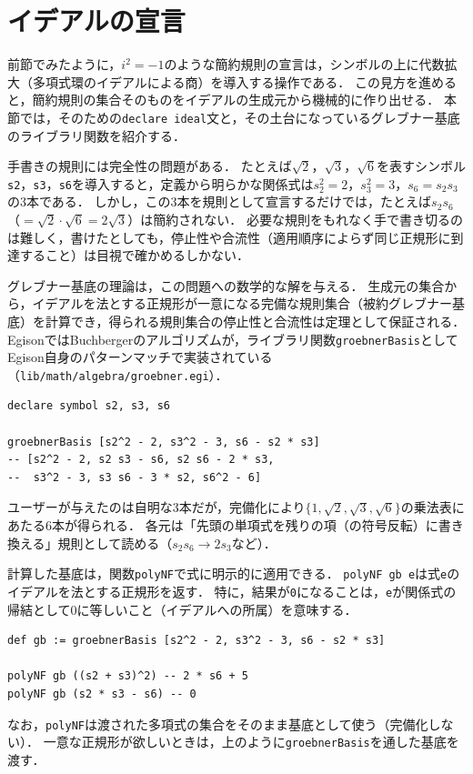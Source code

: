 \section{イデアルの宣言}\label{casdetail-ideal}

前節でみたように，$i^2 = -1$のような簡約規則の宣言は，シンボルの上に代数拡大（多項式環のイデアルによる商）を導入する操作である．
この見方を進めると，簡約規則の集合そのものをイデアルの生成元から機械的に作り出せる．
本節では，そのための\lstinline{declare ideal}文と，その土台になっているグレブナー基底のライブラリ関数を紹介する．

手書きの規則には完全性の問題がある．
たとえば$\sqrt{2}$，$\sqrt{3}$，$\sqrt{6}$を表すシンボル\lstinline{s2}，\lstinline{s3}，\lstinline{s6}を導入すると，定義から明らかな関係式は$s_2^2 = 2$，$s_3^2 = 3$，$s_6 = s_2 s_3$の3本である．
しかし，この3本を規則として宣言するだけでは，たとえば$s_2 s_6$（$= \sqrt{2}\cdot\sqrt{6} = 2\sqrt{3}$）は簡約されない．
必要な規則をもれなく手で書き切るのは難しく，書けたとしても，停止性や合流性（適用順序によらず同じ正規形に到達すること）は目視で確かめるしかない．

グレブナー基底の理論は，この問題への数学的な解を与える．
生成元の集合から，イデアルを法とする正規形が一意になる完備な規則集合（被約グレブナー基底）を計算でき，得られる規則集合の停止性と合流性は定理として保証される．
EgisonではBuchbergerのアルゴリズムが，ライブラリ関数\lstinline{groebnerBasis}としてEgison自身のパターンマッチで実装されている（\texttt{lib/math/algebra/groebner.egi}）．
\begin{lstlisting}[language=egison,numbers=none]
declare symbol s2, s3, s6

groebnerBasis [s2^2 - 2, s3^2 - 3, s6 - s2 * s3]
-- [s2^2 - 2, s2 s3 - s6, s2 s6 - 2 * s3,
--  s3^2 - 3, s3 s6 - 3 * s2, s6^2 - 6]
\end{lstlisting}
ユーザーが与えたのは自明な3本だが，完備化により$\{1, \sqrt{2}, \sqrt{3}, \sqrt{6}\}$の乗法表にあたる6本が得られる．
各元は「先頭の単項式を残りの項（の符号反転）に書き換える」規則として読める（$s_2 s_6 \to 2 s_3$など）．

計算した基底は，関数\lstinline{polyNF}で式に明示的に適用できる．
\lstinline{polyNF gb e}は式\lstinline{e}のイデアルを法とする正規形を返す．
特に，結果が\lstinline{0}になることは，\lstinline{e}が関係式の帰結として0に等しいこと（イデアルへの所属）を意味する．
\begin{lstlisting}[language=egison,numbers=none]
def gb := groebnerBasis [s2^2 - 2, s3^2 - 3, s6 - s2 * s3]

polyNF gb ((s2 + s3)^2) -- 2 * s6 + 5
polyNF gb (s2 * s3 - s6) -- 0
\end{lstlisting}
なお，\lstinline{polyNF}は渡された多項式の集合をそのまま基底として使う（完備化しない）．
一意な正規形が欲しいときは，上のように\lstinline{groebnerBasis}を通した基底を渡す．

